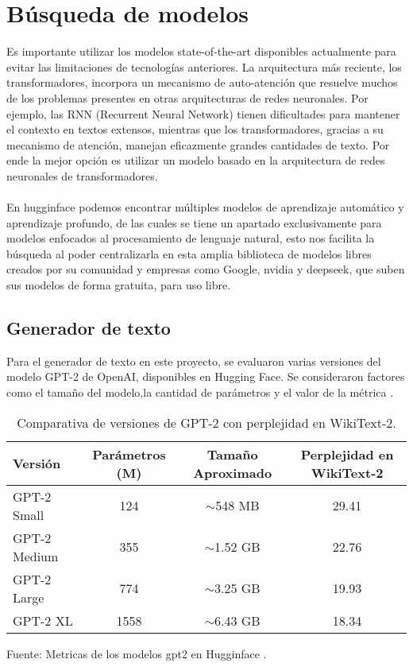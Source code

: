 \section{Búsqueda de modelos}

Es importante utilizar los modelos state-of-the-art disponibles actualmente para evitar las limitaciones de tecnologías anteriores. La arquitectura más reciente, los transformadores, incorpora un mecanismo de auto-atención que resuelve muchos de los problemas presentes en otras arquitecturas de redes neuronales. Por ejemplo, las RNN (Recurrent Neural Network) tienen dificultades para mantener el contexto en textos extensos, mientras que los transformadores, gracias a su mecanismo de atención, manejan eficazmente grandes cantidades de texto. Por ende la mejor opción es utilizar un modelo basado en la arquitectura de redes neuronales de transformadores.
\\
\\
En hugginface podemos encontrar múltiples modelos de aprendizaje automático y aprendizaje profundo, de las cuales se tiene un apartado exclusivamente para modelos enfocados al procesamiento de lenguaje natural, esto nos facilita la búsqueda al poder centralizarla en esta amplia biblioteca de modelos libres creados por su comunidad y empresas como Google, nvidia y deepseek, que suben sus modelos de forma gratuita, para uso libre.

\newpage
\subsection{Generador de texto}

Para el generador de texto en este proyecto, se evaluaron varias versiones del modelo GPT-2 de OpenAI, disponibles en Hugging Face. Se consideraron factores como el tamaño del modelo,la cantidad de parámetros y el valor de la métrica \cite{huggingfacegpt2}.

\begin{table}[H]
\centering
\begin{tabular}{lccc}
\hline
\textbf{Versión} & \textbf{Parámetros (M)} & \textbf{Tamaño Aproximado} & \textbf{Perplejidad en WikiText-2} \\
\hline
GPT-2 Small  & 124  & $\sim$548 MB & 29.41 \\
GPT-2 Medium & 355  & $\sim$1.52 GB & 22.76 \\
GPT-2 Large  & 774  & $\sim$3.25 GB & 19.93 \\
GPT-2 XL     & 1558 & $\sim$6.43 GB & 18.34 \\
\hline
\end{tabular}
\caption{Comparativa de versiones de GPT-2 con perplejidad en WikiText-2.}
Fuente: Metricas de los modelos gpt2 en Hugginface \cite{huggingfacegpt2}.
\end{table}

